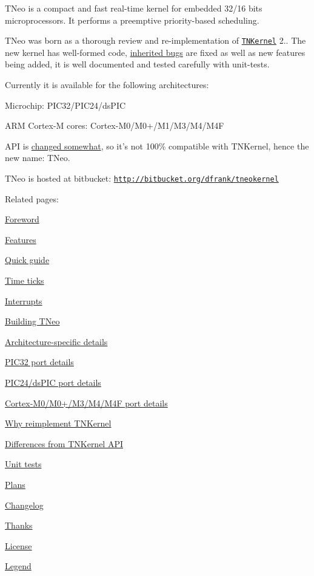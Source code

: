 T\+Neo is a compact and fast real-\/time kernel for embedded 32/16 bits microprocessors. It performs a preemptive priority-\/based scheduling.

T\+Neo was born as a thorough review and re-\/implementation of \href{http://tnkernel.com}{\tt T\+N\+Kernel} 2.. The new kernel has well-\/formed code, \hyperlink{why_reimplement_why_reimplement__bugs}{inherited bugs} are fixed as well as new features being added, it is well documented and tested carefully with unit-\/tests.

Currently it is available for the following architectures\+:


\begin{DoxyItemize}
\item Microchip\+: P\+I\+C32/\+P\+I\+C24/ds\+P\+I\+C
\item A\+R\+M Cortex-\/\+M cores\+: Cortex-\/\+M0/\+M0+/\+M1/\+M3/\+M4/\+M4\+F
\end{DoxyItemize}

A\+P\+I is \hyperlink{tnkernel_diff}{changed somewhat}, so it's not 100\% compatible with T\+N\+Kernel, hence the new name\+: T\+Neo.

T\+Neo is hosted at bitbucket\+: \href{http://bitbucket.org/dfrank/tneokernel}{\tt http\+://bitbucket.\+org/dfrank/tneokernel}

Related pages\+:


\begin{DoxyItemize}
\item \hyperlink{foreword}{Foreword}
\item \hyperlink{features}{Features}
\item \hyperlink{quick_guide}{Quick guide}
\item \hyperlink{time_ticks}{Time ticks}
\item \hyperlink{interrupts}{Interrupts}
\item \hyperlink{building}{Building T\+Neo}
\item \hyperlink{arch_specific}{Architecture-\/specific details}
\begin{DoxyItemize}
\item \hyperlink{arch_specific_pic32_details}{P\+I\+C32 port details}
\item \hyperlink{arch_specific_pic24_details}{P\+I\+C24/ds\+P\+I\+C port details}
\item \hyperlink{arch_specific_cortex_m_details}{Cortex-\/\+M0/\+M0+/\+M3/\+M4/\+M4\+F port details}
\end{DoxyItemize}
\item \hyperlink{why_reimplement}{Why reimplement T\+N\+Kernel}
\item \hyperlink{tnkernel_diff}{Differences from T\+N\+Kernel A\+P\+I}
\item \hyperlink{unit_tests}{Unit tests}
\item \hyperlink{plans}{Plans}
\item \hyperlink{changelog}{Changelog}
\item \hyperlink{thanks}{Thanks}
\item \hyperlink{license}{License}
\item \hyperlink{legend}{Legend}
\end{DoxyItemize}

